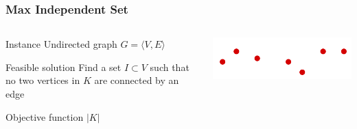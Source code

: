 \documentclass[12pt,aspectratio=169]{beamer}
\begin{document}
\begin{frame}\frametitle{Max Independent Set }
\begin{columns} 
  \begin{column}{0.48\textwidth}
  \begin{block}{Instance}
    Undirected graph $G=\langle V,E \rangle$
  \end{block}
  \begin{block}{Feasible solution}
    Find a set $I\subset V$ such that no two vertices in $K$ are connected by an edge
  \end{block}
    \begin{block}{Objective function}
      $|K|$
    \end{block}
  \end{column}
    
    \begin{column}{0.48\textwidth}
      \centering
  \includegraphics[height=0.2\textheight]{img/Vertex-cover}
\end{column}
\end{columns}
\end{frame}
\end{document}
